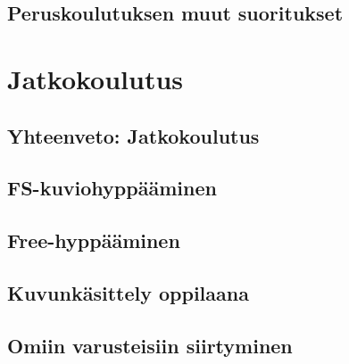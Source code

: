 \documentclass[10pt,twoside,openany,hidelinks]{memoir}
\begin{document}
\chapter{Peruskoulutuksen muut suoritukset}
\label{peruskoulutuksen-muut-suoritukset}
\thispagestyle{headings}
\begin{multicols}{2}
\end{multicols}

\part{Jatkokoulutus}\chapter{Yhteenveto: Jatkokoulutus}
\label{yhteenveto-jatkokoulutus}
\thispagestyle{headings}
\begin{multicols}{2}
\end{multicols}

\chapter{FS-kuviohyppääminen}
\label{fs-kuviohyppaaminen}
\thispagestyle{headings}
\begin{multicols}{2}
\end{multicols}

\chapter{Free-hyppääminen}
\label{free-hyppaaminen}
\thispagestyle{headings}
\begin{multicols}{2}
\end{multicols}

\chapter{Kuvunkäsittely oppilaana}
\label{kuvunkasittely-oppilaana}
\thispagestyle{headings}
\begin{multicols}{2}
\end{multicols}

\chapter{Omiin varusteisiin siirtyminen}
\label{omiin-varusteisiin-siirtyminen}
\thispagestyle{headings}
\begin{multicols}{2}
\end{multicols}
\end{document}
